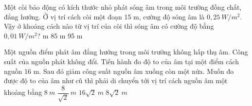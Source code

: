 \begin{vidu}%
Một còi báo động có kích thước nhỏ phát sóng âm trong môi trường đồng chất, đẳng hướng. Ở vị trí cách còi một đoạn 15 m, cường độ sóng âm là $0,25\ W/m^2$. Vậy ở khoảng cách nào từ vị trí của còi thì sóng âm có cường độ bằng $0,01\ W/m^2$?
{ m}
{85 m}
{95 m}
\end{vidu} %
\begin{vidu}%
Một nguồn điểm phát âm đẳng hướng trong môi trường không hấp thụ âm. Công suất của nguồn phát không đổi. Tiến hành đo độ to của âm tại một điểm cách nguồn 16 m. Sau đó giảm công suất nguồn âm xuống còn một nửa. Muốn đo được độ to của âm như cũ thì phải di chuyển tới vị trí cách nguồn âm một khoảng bằng
\choice
{$8\ m$}
{$\dfrac{8}{\sqrt2}\ m$}
{$16\sqrt2\ m$}
{\True $8\sqrt2\ m$}
\end{vidu} %
